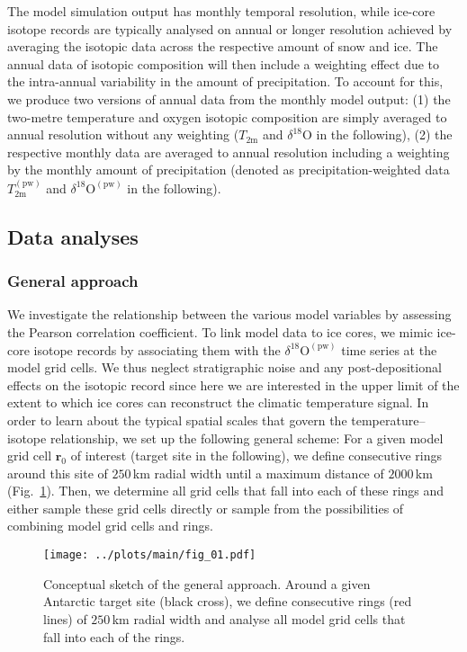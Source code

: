 \documentclass[cp, manuscript]{copernicus}
\begin{document}
The model simulation output has monthly temporal resolution, while ice-core
isotope records are typically analysed on annual or longer resolution achieved
by averaging the isotopic data across the respective amount of snow and
ice. The annual data of isotopic composition will then include a weighting
effect due to the intra-annual variability in the amount of precipitation. To
account for this, we produce two versions of annual data from the monthly model
output: (1) the two-metre temperature and oxygen isotopic composition are simply
averaged to annual resolution without any weighting ($T_{2\mathrm{m}}$ and
$\delta^{18}\mathrm{O}$ in the following), (2) the respective monthly data are
averaged to annual resolution including a weighting by the monthly amount of
precipitation (denoted as precipitation-weighted data
$T_{2\mathrm{m}}^{\mathrm{(pw)}}$ and $\delta^{18}\mathrm{O}^{\mathrm{(pw)}}$ in
the following).

\subsection{Data analyses}\label{methods:main}

\subsubsection{General approach}\label{methods:general}

We investigate the relationship between the various model variables by assessing
the Pearson correlation coefficient. To link model data to ice cores, we mimic
ice-core isotope records by associating them with the
$\delta^{18}\mathrm{O}^{\mathrm{(pw)}}$ time series at the model grid cells. We
thus neglect stratigraphic noise and any post-depositional effects on the
isotopic record since here we are interested in the upper limit of the extent to
which ice cores can reconstruct the climatic temperature signal. In order to
learn about the typical spatial scales that govern the temperature--isotope
relationship, we set up the following general scheme: For a given model grid
cell $\mathbf{r}_0$ of interest (target site in the following), we define
consecutive rings around this site of $250$\,km radial width until a maximum
distance of $2000$\,km (Fig.~\ref{fig:concept}). Then, we determine all grid
cells that fall into each of these rings and either sample these grid cells
directly or sample from the possibilities of combining model grid cells and
rings.

\begin{figure}[t]%
\centering
\texttt{[image: ../plots/main/fig\_01.pdf]}
\caption[Conceptual approach]{%
  Conceptual sketch of the general approach. Around a given Antarctic target
  site (black cross), we define consecutive rings (red lines) of $250$\,km
  radial width and analyse all model grid cells that fall into each of the
  rings.}
\label{fig:concept}%
\end{figure}%
\end{document}
